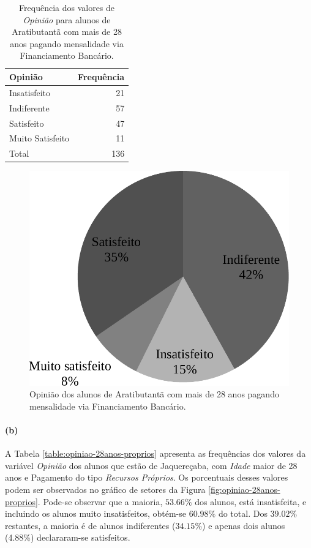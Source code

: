 \documentclass[10pt,a4paper,oneside]{article}
\newcommand{\arat}{Aratibutantã\xspace}
\newcommand{\jaqu}{Jaquereçaba\xspace}
\begin{document}
\begin{table}[!h]
	\small
	\centering
	\caption{Frequência dos valores de \textit{Opinião} para alunos de \arat com mais de 28 anos pagando mensalidade via Financiamento Bancário.}
	\label{table:opiniao-28anos-finBancario}
	\begin{tabular}{l r}
		\toprule
		\textbf{Opinião} & \textbf{Frequência} \\
		\midrule
		Insatisfeito     &  21 \\
		Indiferente      &  57 \\
		Satisfeito       &  47 \\
		Muito Satisfeito &  11 \\
		\midrule
		Total            &  136 \\
		\bottomrule
	\end{tabular}
\end{table}

\begin{figure}[!h]
	\centering
	\includegraphics[width=.5\linewidth]{plots/q17a.pdf}
	\caption{Opinião dos alunos de \arat com mais de 28 anos pagando mensalidade via Financiamento Bancário.}
	\label{fig:opiniao-28anos-finBancario}
\end{figure}

\paragraph{(b)}

A Tabela \ref{table:opiniao-28anos-proprios} apresenta as frequências dos valores da variável \textit{Opinião} dos alunos que estão de \jaqu, com \textit{Idade} maior de 28 anos e Pagamento do tipo \textit{Recursos Próprios}. Os porcentuais desses valores podem ser observados no gráfico de setores da Figura \ref{fig:opiniao-28anos-proprios}.
Pode-se observar que a maioria, $53.66\%$ dos alunos, está insatisfeita, e incluindo os alunos muito insatisfeitos, obtém-se $60.98\%$ do total. Dos $39.02\%$ restantes, a maioria é de alunos indiferentes ($34.15\%$) e apenas dois alunos (4.88\%) declararam-se satisfeitos.
\end{document}
